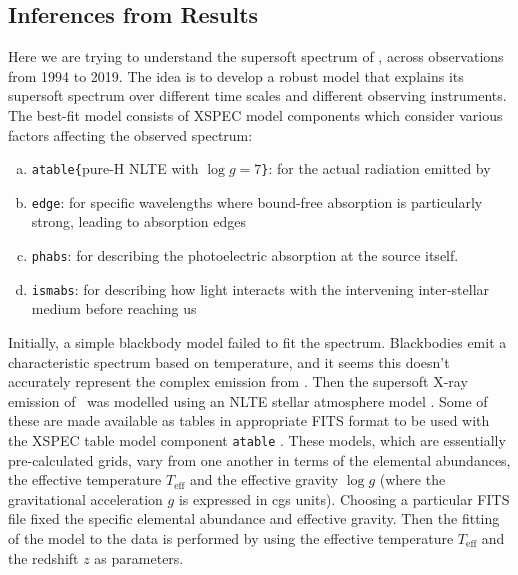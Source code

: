     	\subsection{Inferences from Results} \label{multi-obs:discussion:inference}
    		Here we are trying to understand the supersoft spectrum of \source, across observations from 1994 to 2019. The idea is to develop a robust model that explains its supersoft spectrum over different time scales and different observing instruments. The best-fit model consists of XSPEC model components which consider various factors affecting the observed spectrum:
		    \begin{enumerate}[a)]
		   		\item \texttt{atable\{}pure-H NLTE with $\log{g}=7$\texttt{\}}: for the actual radiation emitted by \source
		   		\item \texttt{edge}: for specific wavelengths where bound-free absorption is particularly strong, leading to absorption edges
		   		\item \texttt{phabs}: for describing the photoelectric absorption at the source itself.
		   		\item \texttt{ismabs}: for describing how light interacts with the intervening inter-stellar medium before reaching us
		   	\end{enumerate}
		   	
		   	Initially, a simple blackbody model failed to fit the spectrum. Blackbodies emit a characteristic spectrum based on temperature, and it seems this doesn't accurately represent the complex emission from \source. Then the supersoft X-ray emission of \source\ was modelled using an NLTE stellar atmosphere model \cite{werner1999classical}. Some of these are made available as tables in appropriate FITS format to be used with the XSPEC table model component \texttt{atable} \cite{rauch2003grid,rauch2010nlte}. These models, which are essentially pre-calculated grids, vary from one another in terms of the elemental abundances, the effective temperature $T_\text{eff}$ and the effective gravity $\log{g}$ (where the gravitational acceleration $g$ is expressed in cgs units). Choosing a particular FITS file fixed the specific elemental abundance and effective gravity. Then the fitting of the model to the data is performed by using the effective temperature $T_\text{eff}$ and the redshift $z$ as parameters.
    
